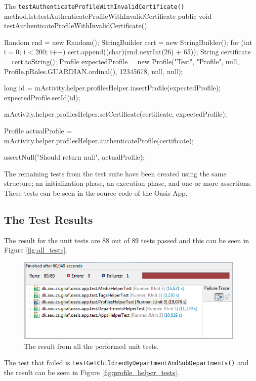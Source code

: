 \begin{Java}{The \texttt{testAuthenticateProfileWithInvalidCertificate()} method.}{lst:testAuthenticateProfileWithInvalidCertificate}
public void testAuthenticateProfileWithInvalidCertificate() {
	Random rnd = new Random();
	StringBuilder cert = new StringBuilder();
	for (int i = 0; i < 200; i++)
	{
		cert.append((char)(rnd.nextInt(26) + 65));
	}
	String certificate = cert.toString();
	Profile expectedProfile = new Profile("Test", "Profile", null, Profile.pRoles.GUARDIAN.ordinal(), 12345678, null, null);

	long id = mActivity.helper.profilesHelper.insertProfile(expectedProfile);
	expectedProfile.setId(id);
	
	mActivity.helper.profilesHelper.setCertificate(certificate, expectedProfile);
			
	Profile actualProfile = mActivity.helper.profilesHelper.authenticateProfile(certificate);

	assertNull("Should return null", actualProfile);
}
\end{Java}

The remaining tests from the test suite have been created using the same structure; an initialization phase, an execution  phase, and one or more assertions.
These tests can be seen in the source code of the Oasis App.

\subsection{The Test Results}
The result for the unit tests are 88 out of 89 tests passed and this can be seen in Figure \vref{fig:all_tests}.

\begin{figure}[H]
	\centering
		\includegraphics[width=\textwidth]{Images/unit_testing/all_tests.PNG}
	\caption{The result from all the performed unit tests.}
	\label{fig:all_tests}
\end{figure}

The test that failed is \texttt{testGetChildrenByDepartmentAndSubDepartments()} and the result can be seen in Figure \vref{fig:profile_helper_tests}.

